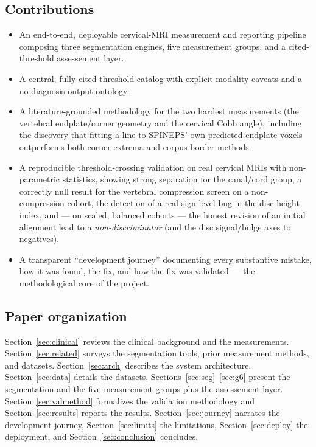 \subsection{Contributions}
\begin{itemize}[leftmargin=*]
  \item An end-to-end, deployable cervical-MRI measurement and reporting pipeline composing three
  segmentation engines, five measurement groups, and a cited-threshold assessement layer.
  \item A central, fully cited threshold catalog with explicit modality caveats and a no-diagnosis
  output ontology.
  \item A literature-grounded methodology for the two hardest measurements (the vertebral
  endplate/corner geometry and the cervical Cobb angle), including the discovery that fitting a line to
  SPINEPS' own predicted endplate voxels outperforms both corner-extrema and corpus-border methods.
  \item A reproducible threshold-crossing validation on real cervical MRIs with non-parametric statistics,
  showing strong separation for the canal/cord group, a correctly null result for the vertebral
  compression screen on a non-compression cohort, the detection of a real sign-level bug in the
  disc-height index, and --- on scaled, balanced cohorts --- the honest revision of an initial alignment
  lead to a \emph{non-discriminator} (and the disc signal/bulge axes to negatives).
  \item A transparent ``development journey'' documenting every substantive mistake, how it was found,
  the fix, and how the fix was validated --- the methodological core of the project.
\end{itemize}

\subsection{Paper organization}
Section~\ref{sec:clinical} reviews the clinical background and the measurements.
Section~\ref{sec:related} surveys the segmentation tools, prior measurement methods, and datasets.
Section~\ref{sec:arch} describes the system architecture. Section~\ref{sec:data} details the datasets.
Sections~\ref{sec:seg}--\ref{sec:g6} present the segmentation and the five measurement groups plus the
assessement layer. Section~\ref{sec:valmethod} formalizes the validation methodology and
Section~\ref{sec:results} reports the results. Section~\ref{sec:journey} narrates the development
journey, Section~\ref{sec:limits} the limitations, Section~\ref{sec:deploy} the deployment, and
Section~\ref{sec:conclusion} concludes.

